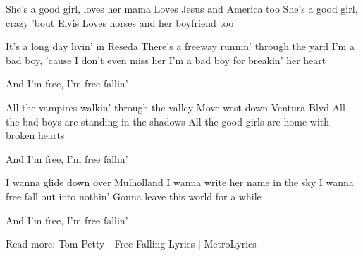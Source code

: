 She's a good girl, loves her mama
Loves Jesus and America too
She's a good girl, crazy 'bout Elvis
Loves horses and her boyfriend too

It's a long day livin' in Reseda
There's a freeway runnin' through the yard
I'm a bad boy, 'cause I don't even miss her
I'm a bad boy for breakin' her heart

And I'm free, I'm free fallin'

All the vampires walkin' through the valley
Move west down Ventura Blvd
All the bad boys are standing in the shadows
All the good girls are home with broken hearts

And I'm free, I'm free fallin'

I wanna glide down over Mulholland
I wanna write her name in the sky
I wanna free fall out into nothin'
Gonna leave this world for a while

And I'm free, I'm free fallin'

Read more: Tom Petty - Free Falling Lyrics | MetroLyrics
